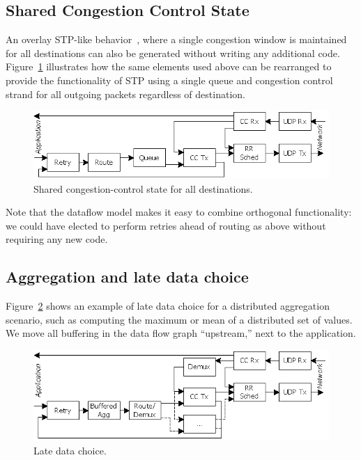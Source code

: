 \subsection{Shared Congestion Control State}

An overlay STP-like behavior~\cite{dabek_nsdi04}, where a single
congestion window is maintained for all destinations can also be
generated without writing any additional code.  Figure~\ref{fig:STP}
illustrates how the same elements used above can be rearranged to
provide the functionality of STP using a single queue and congestion
control strand for all outgoing packets regardless of destination.

\begin{figure}
\centerline{\includegraphics{transport/STP}}
\caption{Shared congestion-control state for all destinations.}
\label{fig:STP}
\end{figure}

Note that the dataflow model makes it easy to combine orthogonal
functionality: we could have elected to perform retries ahead of
routing as above without requiring any new code. 

\subsection{Aggregation and late data choice}

Figure~\ref{fig:BufferedAggregation} shows an example of late data
choice for a distributed aggregation scenario, such as computing
the maximum or mean of a distributed set of values.  We move all
buffering in the data flow graph ``upstream,'' next to the
application. 

\begin{figure}
\centerline{\includegraphics{transport/BufferedAggregationRetries}}
\caption{Late data choice.}
\label{fig:BufferedAggregation}
\end{figure}

